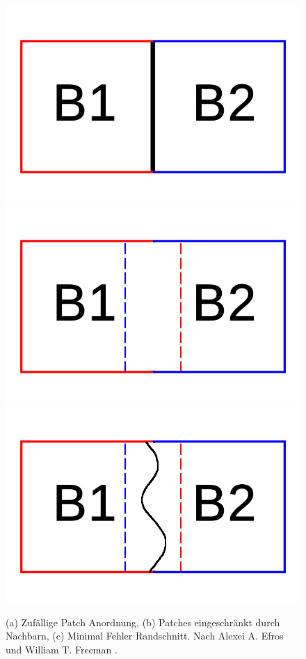 \documentclass[12pt, a4paper,twoside,openany]{report} %
\begin{document}
\begin{figure}[H]
    \centering
    \includegraphics[width=0.25\linewidth]{images/Random-blocks.jpg}%
    \qquad
    \includegraphics[width=0.25\linewidth]{images/overlap-blocks.jpg}%
    \qquad
    \includegraphics[width=0.25\linewidth]{images/minimum-boundary-blocks.jpg}%
    \qquad
    \qquad
    \qquad
    \qquad
    \caption{(a) Zufällige Patch Anordnung, (b) Patches eingeschränkt durch Nachbarn, (c) Minimal Fehler Randschnitt. Nach Alexei A. Efros und William T. Freeman \cite{EfrosQuilt}.}%
\end{figure}
\end{document}
